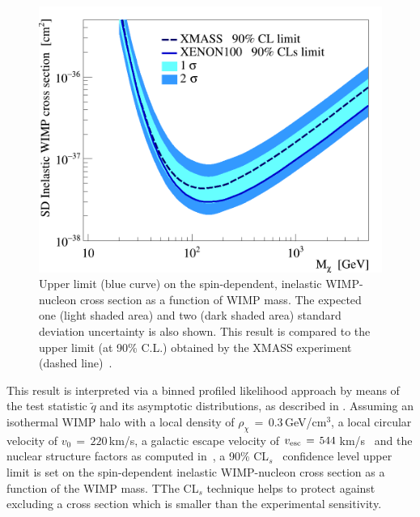 \begin{figure}[t]
  \includegraphics[width=\linewidth]{limit_reb.png}
  \caption{Upper limit (blue curve) on the spin-dependent, inelastic WIMP-nucleon cross section as a function of WIMP mass.  
	  The expected one (light shaded area) and two (dark shaded area) standard deviation uncertainty is also shown. 
	  This result is compared to the upper limit (at 90\% C.L.) obtained by the XMASS experiment (dashed line)~\cite{Uchida:2014cnn}.}
  \label{fig:limits}
\end{figure}

This result is interpreted via a binned profiled likelihood approach by means of the test statistic $\tilde{q}$
and its asymptotic distributions, as  described in \cite{asympt}. 
Assuming  an isothermal WIMP halo with a local density of $\rho_{\chi} \, = \, 0.3$\,GeV/cm$^3$, a local circular velocity of $v_0 \,= \, 220$\,km/s, 
a galactic escape velocity of $v_{\rm{esc}} \, = \, 544$\,km/s~\cite{Smith:2006ym}  
and the nuclear structure factors as computed in~\cite{Baudis:2013bba}, 
a 90\% CL$_s$~\cite{cls} confidence level upper limit is set on the spin-dependent inelastic WIMP-nucleon cross section as a function of the WIMP mass. 
{\ale TThe CL$_s$ technique helps to protect against excluding  a cross section which is smaller than the experimental sensitivity.}


